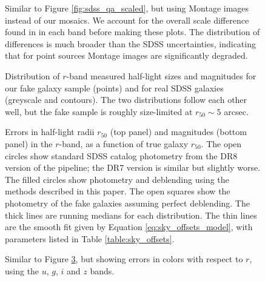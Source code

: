 \clearpage
{}
\begin{figure}
\figurenum{\fignum}
\caption{\label{fig:montage_qa_scaled} Similar to Figure
\ref{fig:sdss_qa_scaled}, but using Montage images instead of our
mosaics. We account for the overall scale difference found in in each band
before making these plots. The distribution of differences is much
broader than the SDSS uncertainties, indicating that for point sources
Montage images are significantly degraded.}
\end{figure}

\clearpage
{}
\begin{figure}
\figurenum{\fignum}
\caption{\label{fig:fakedist} Distribution of $r$-band measured
  half-light sizes and magnitudes for our fake galaxy sample (points)
  and for real SDSS galaxies (greyscale and contours). The two
  distributions follow each other well, but the fake sample is roughly
  size-limited at $r_{50} \sim 5$ arcsec.}
\end{figure}

\clearpage
{}
\begin{figure}
\figurenum{\fignum}
\caption{\label{fig:sky_offsets_ronly} Errors in half-light radii $r_{50}$
  (top panel) and magnitudes (bottom panel) in the $r$-band, as a
  function of true galaxy $r_{50}$. The open circles show standard
  SDSS catalog photometry from the DR8 version of the pipeline; the
  DR7 version is similar but slightly worse. The filled circles show
  photometry and deblending using the methods described in this paper.
  The open squares show the photometry of the fake galaxies assuming
  perfect deblending.  The thick lines are running medians for each
  distribution. The thin lines are the smooth fit given by Equation
  \ref{eq:sky_offsets_model}, with parameters listed in Table
  \ref{table:sky_offsets}.}
\end{figure}

\clearpage
{}
\begin{figure}
\figurenum{\fignum}
\caption{\label{fig:sky_offsets_ugiz} Similar to Figure
  \ref{fig:sky_offsets_ronly}, but showing errors in colors with respect to
  $r$, using the $u$, $g$, $i$ and $z$ bands.}
\end{figure}

